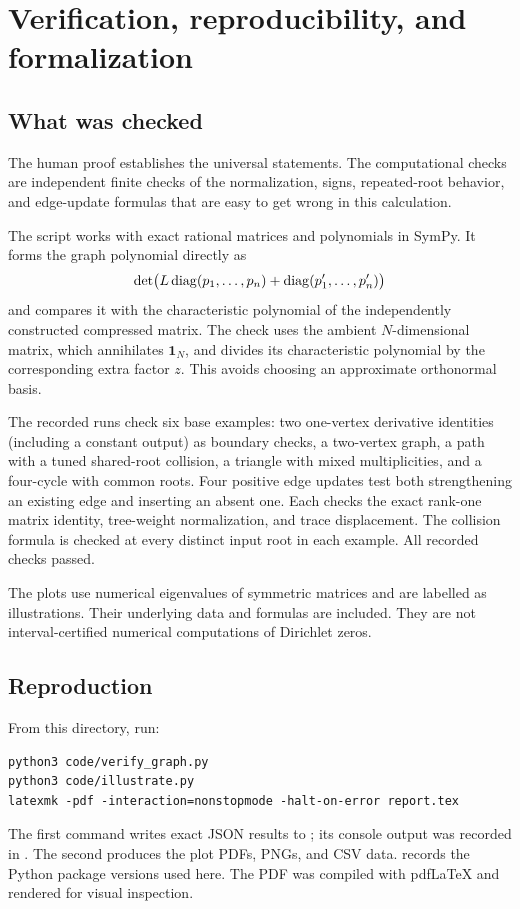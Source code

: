 \section{Verification, reproducibility, and formalization}

\subsection{What was checked}

The human proof establishes the universal statements.  The computational
checks are independent finite checks of the normalization, signs,
repeated-root behavior, and edge-update formulas that are easy to get
wrong in this calculation.

The script  works with exact rational matrices
and polynomials in SymPy.  It forms the graph polynomial directly as
\[
 \det\bigl(L\operatorname{diag}(p_1,\ldots,p_n)+\operatorname{diag}(p_1',\ldots,p_n')\bigr)
\]
and compares it with the characteristic polynomial of the independently
constructed compressed matrix.  The check uses the ambient $N$-dimensional
matrix, which annihilates $\boldsymbol1_N$, and divides its characteristic
polynomial by the corresponding extra factor $z$.  This avoids choosing
an approximate orthonormal basis.

The recorded runs check six base examples: two one-vertex derivative
identities (including a constant output) as boundary checks, a two-vertex graph, a path with a tuned
shared-root collision, a triangle with mixed multiplicities, and a
four-cycle with common roots.  Four positive edge updates test both
strengthening an existing edge and inserting an absent one.  Each checks
the exact rank-one matrix identity, tree-weight normalization, and trace
displacement.  The collision formula is checked at every distinct input
root in each example.  All recorded checks passed.

The plots use numerical eigenvalues of symmetric matrices and are labelled
as illustrations.  Their underlying data and formulas are included.  They
are not interval-certified numerical computations of Dirichlet zeros.

\subsection{Reproduction}

From this directory, run:
\begin{verbatim}
python3 code/verify_graph.py
python3 code/illustrate.py
latexmk -pdf -interaction=nonstopmode -halt-on-error report.tex
\end{verbatim}
The first command writes exact JSON results to ;
its console output was recorded in .
The second produces the plot PDFs, PNGs, and CSV data.
 records the Python package versions used here.
The PDF was compiled with pdfLaTeX and rendered for visual inspection.

